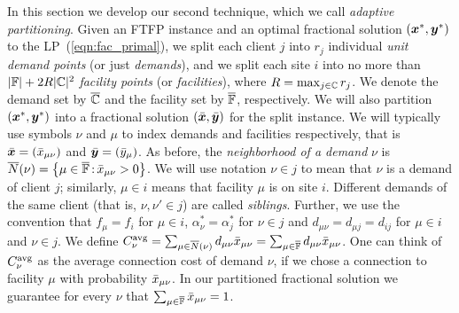 \documentclass[oneside,final]{ucr}
\begin{document}
In this section we develop our second technique, which we
call \emph{adaptive partitioning}. Given an FTFP instance
and an optimal fractional solution $(\boldsymbol{x}^\ast, \boldsymbol{y}^\ast)$
to the LP~(\ref{eqn:fac_primal}), we split each client $j$
into $r_j$ individual \emph{unit demand points} (or just
\emph{demands}), and we split each site $i$ into no more
than $|\mathbb{F}|+2R|\mathbb{C}|^2$ \emph{facility points}
(or \emph{facilities}), where
$R=\max_{j\in\mathbb{C}}r_j$. We denote the demand set by
$\overline{\mathbb{C}}$ and the facility set by $\overline{\mathbb{F}}$,
respectively.  We will also partition
$(\boldsymbol{x}^\ast,\boldsymbol{y}^\ast)$ into a fractional solution
$(\bar{\boldsymbol{x}},\bar{\boldsymbol{y}})$ for the split instance.  We will
typically use symbols $\nu$ and $\mu$ to index demands and
facilities respectively, that is $\bar{\boldsymbol{x}} =
({\bar x}_{\mu\nu})$ and $\bar{\boldsymbol{y}} = ({\bar y}_{\mu})$.  As before,
the \emph{neighborhood of a demand} $\nu$ is
${\overline{N}}(\nu)={ \left\{ \mu\in\overline{\mathbb{F}} {\,:\,}
  {\bar x}_{\mu\nu}>0 \right\} }$.  We will use notation $\nu\in j$ to
mean that $\nu$ is a demand of client $j$; similarly,
$\mu\in i$ means that facility $\mu$ is on site
$i$. Different demands of the same client (that is,
$\nu,\nu'\in j$) are called \emph{siblings}.  Further, we
use the convention that $f_\mu = f_i$ for $\mu\in i$,
$\alpha_\nu^\ast = \alpha_j^\ast$ for $\nu\in j$ and
$d_{\mu\nu} = d_{\mu j} = d_{ij}$ for $\mu\in i$ and $\nu\in
j$.  We define $C^{{\mbox{\scriptsize\rm avg}}}_{\nu}
=\sum_{\mu\in{\overline{N}}(\nu)}d_{\mu\nu}{\bar x}_{\mu\nu} =
\sum_{\mu\in\overline{\mathbb{F}}}d_{\mu\nu}{\bar x}_{\mu\nu}$.  One can
think of $C^{{\mbox{\scriptsize\rm avg}}}_{\nu}$ as the average connection cost of
demand $\nu$, if we chose a connection to facility $\mu$
with probability ${\bar x}_{\mu\nu}$. In our partitioned
fractional solution we guarantee for every $\nu$ that
$\sum_{\mu\in\overline{\mathbb{F}}} {\bar x}_{\mu\nu}=1$.
\end{document}
